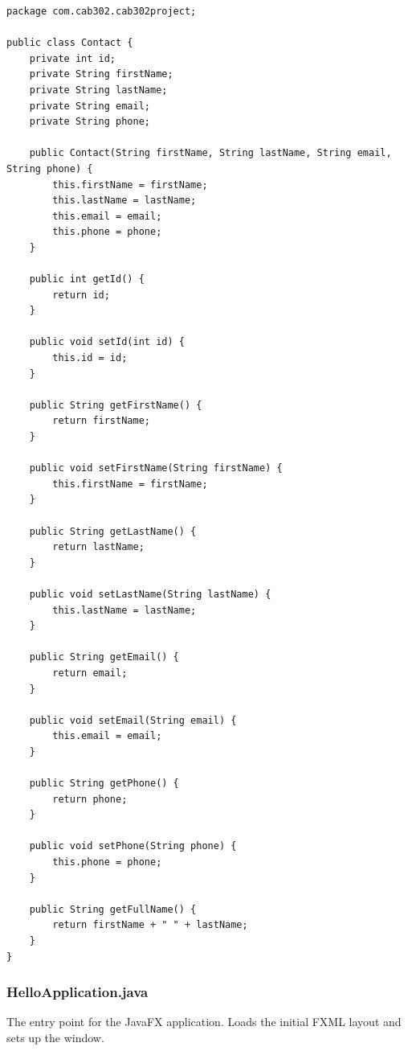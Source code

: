 \documentclass{article}
\begin{document}
\begin{verbatim}
package com.cab302.cab302project;

public class Contact {
    private int id;
    private String firstName;
    private String lastName;
    private String email;
    private String phone;

    public Contact(String firstName, String lastName, String email, String phone) {
        this.firstName = firstName;
        this.lastName = lastName;
        this.email = email;
        this.phone = phone;
    }

    public int getId() {
        return id;
    }

    public void setId(int id) {
        this.id = id;
    }

    public String getFirstName() {
        return firstName;
    }

    public void setFirstName(String firstName) {
        this.firstName = firstName;
    }

    public String getLastName() {
        return lastName;
    }

    public void setLastName(String lastName) {
        this.lastName = lastName;
    }

    public String getEmail() {
        return email;
    }

    public void setEmail(String email) {
        this.email = email;
    }

    public String getPhone() {
        return phone;
    }

    public void setPhone(String phone) {
        this.phone = phone;
    }

    public String getFullName() {
        return firstName + " " + lastName;
    }
}
\end{verbatim}

\subsubsection*{HelloApplication.java}
The entry point for the JavaFX application. Loads the initial FXML layout and sets up the window.
\end{document}
